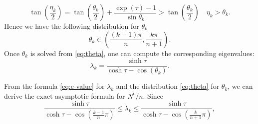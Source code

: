 \documentclass[11pt]{amsart}
\newtheorem{remark}{Remark}[section]
\begin{document}
	\begin{equation}
	\tan\left(\frac{\eta_k}{2}\right) = \tan\left(\frac{\theta_k}{2}\right) + \frac{\exp(\tau) - 1}{\sin\theta_k}> \tan\left(\frac{\theta_k}{2}\right) \quad \eta_k > \theta_k.
	\end{equation}
Hence we have the following distribution for $\theta_k$
\begin{equation}
 \theta_k \in (\frac{(k-1)\pi}{n}, \frac{k\pi}{n+1}).
\end{equation}
Once $\theta_k$ is solved from \eqref{eq:theta}, one can compute the corresponding eigenvalues:
\begin{equation}
\label{eq:e-value}
\lambda_k = \frac{\sinh\tau}{\cosh\tau - \cos(\theta_k)}.
\end{equation}


From the formula \eqref{eq:e-value} for $\lambda_k$ and the distribution \eqref{eq:theta} for $\theta_k$, we can derive the exact asymptotic formula for $N^{\epsilon}/n$. Since 
\[
\frac{\sinh\tau}{\cosh \tau - \cos(\frac{k-1}{n}\pi)}\le \lambda_k \le \frac{\sinh\tau}{\cosh \tau - \cos(\frac{k}{n+1}\pi)},
\]
\end{document}
